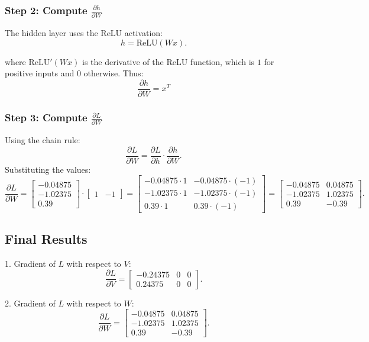 \documentclass[12pt]{article}
\begin{document}
\subsubsection*{Step 2: Compute \( \frac{\partial h}{\partial W} \)}

The hidden layer uses the ReLU activation:
\[
h = \text{ReLU}(Wx).
\]

where \( \text{ReLU}'(Wx) \) is the derivative of the ReLU function, which is \( 1 \) for positive inputs and \( 0 \) otherwise. 
Thus:
\[
\frac{\partial h}{\partial W}
=
x^T

\]

\subsubsection*{Step 3: Compute \( \frac{\partial L}{\partial W} \)}

Using the chain rule:
\[
\frac{\partial L}{\partial W} = \frac{\partial L}{\partial h} \cdot \frac{\partial h}{\partial W}.
\]
Substituting the values:
\[
\frac{\partial L}{\partial W} =
\begin{bmatrix}
-0.04875 \\
-1.02375 \\
0.39
\end{bmatrix}
\cdot
\begin{bmatrix}
1 & -1
\end{bmatrix}
=
\begin{bmatrix}
-0.04875 \cdot 1 & -0.04875 \cdot (-1) \\
-1.02375 \cdot 1 & -1.02375 \cdot (-1) \\
0.39 \cdot 1 & 0.39 \cdot (-1)
\end{bmatrix}
=
\begin{bmatrix}
-0.04875 & 0.04875 \\
-1.02375 & 1.02375 \\
0.39 & -0.39
\end{bmatrix}.
\]

\subsection*{Final Results}

1. Gradient of \( L \) with respect to \( V \):
\[
\frac{\partial L}{\partial V} =
\begin{bmatrix}
-0.24375 & 0 & 0 \\
0.24375 & 0 & 0
\end{bmatrix}.
\]

2. Gradient of \( L \) with respect to \( W \):
\[
\frac{\partial L}{\partial W} =
\begin{bmatrix}
-0.04875 & 0.04875 \\
-1.02375 & 1.02375 \\
0.39 & -0.39
\end{bmatrix}.
\]







 
\end{document}
